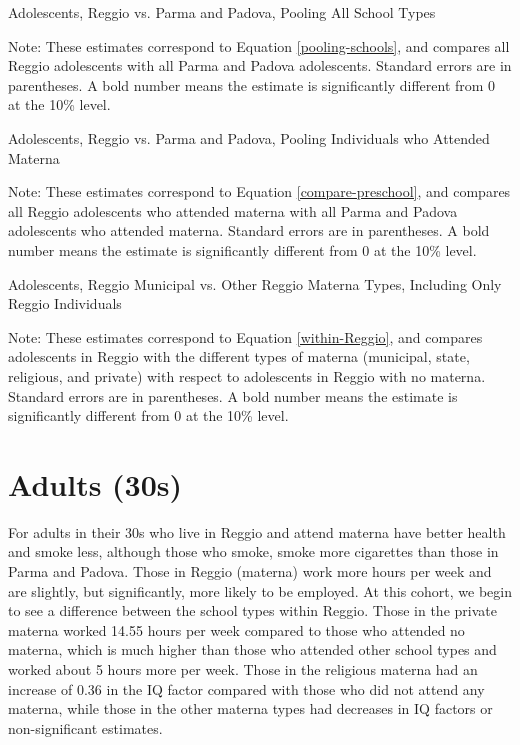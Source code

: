 \documentclass{article}
\begin{document}
\begin{table}[H]
\begin{center}
	\caption{Adolescents, Reggio vs. Parma and Padova, Pooling All School Types}
		
\end{center}
\raggedright
\footnotesize
Note: These estimates correspond to Equation \ref{pooling-schools}, and compares all Reggio adolescents with all Parma and Padova adolescents. Standard errors are in parentheses. A bold number means the estimate is significantly different from 0 at the 10\% level. 
\end{table}

\begin{table}[H]
\begin{center}
	\caption{Adolescents, Reggio vs. Parma and Padova, Pooling Individuals who Attended Materna}
		
\end{center}
\raggedright
\footnotesize
Note: These estimates correspond to Equation \ref{compare-preschool}, and compares all Reggio adolescents who attended materna with all Parma and Padova adolescents who attended materna. Standard errors are in parentheses. A bold number means the estimate is significantly different from 0 at the 10\% level. 
\end{table}

\begin{table}[H]
\begin{center}
	\caption{Adolescents, Reggio Municipal vs. Other Reggio Materna Types, Including Only Reggio Individuals}
		
\end{center}
\raggedright
\footnotesize
Note: These estimates correspond to Equation \ref{within-Reggio}, and compares adolescents in Reggio with the different types of materna (municipal, state, religious, and private) with respect to adolescents in Reggio with no materna. Standard errors are in parentheses. A bold number means the estimate is significantly different from 0 at the 10\% level. 
\end{table}

\section{Adults (30s)}
For adults in their 30s who live in Reggio and attend materna have better health and smoke less, although those who smoke, smoke more cigarettes than those in Parma and Padova. Those in Reggio (materna) work more hours per week and are slightly, but significantly, more likely to be employed. At this cohort, we begin to see a difference between the school types within Reggio. Those in the private materna worked 14.55 hours per week compared to those who attended no materna, which is much higher than those who attended other school types and worked about 5 hours more per week. Those in the religious materna had an increase of 0.36 in the IQ factor compared with those who did not attend any materna, while those in the other materna types had decreases in IQ factors or non-significant estimates.
\end{document}
